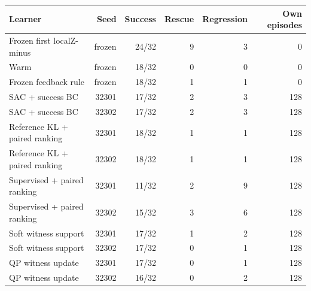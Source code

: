 \begin{tabular}{lrrrrr}
\toprule
Learner & Seed & Success & Rescue & Regression & Own episodes \\
\midrule
Frozen first localZ-minus & frozen & 24/32 & 9 & 3 & 0 \\
Warm & frozen & 18/32 & 0 & 0 & 0 \\
Frozen feedback rule & frozen & 18/32 & 1 & 1 & 0 \\
SAC + success BC & 32301 & 17/32 & 2 & 3 & 128 \\
SAC + success BC & 32302 & 17/32 & 2 & 3 & 128 \\
Reference KL + paired ranking & 32301 & 18/32 & 1 & 1 & 128 \\
Reference KL + paired ranking & 32302 & 18/32 & 1 & 1 & 128 \\
Supervised + paired ranking & 32301 & 11/32 & 2 & 9 & 128 \\
Supervised + paired ranking & 32302 & 15/32 & 3 & 6 & 128 \\
Soft witness support & 32301 & 17/32 & 1 & 2 & 128 \\
Soft witness support & 32302 & 17/32 & 0 & 1 & 128 \\
QP witness update & 32301 & 17/32 & 0 & 1 & 128 \\
QP witness update & 32302 & 16/32 & 0 & 2 & 128 \\
\bottomrule
\end{tabular}

